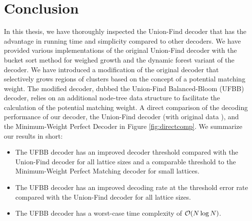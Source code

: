 \section{Conclusion}\label{sec:conclusion}

In this thesis, we have thoroughly inspected the Union-Find decoder that has the advantage in running time and simplicity compared to other decoders. We have provided various implementations of the original Union-Find decoder with the bucket sort method for weighed growth and the dynamic forest variant of the decoder. We have introduced a modification of the original decoder that selectively grows regions of clusters based on the concept of a potential matching weight. The modified decoder, dubbed the Union-Find Balanced-Bloom (UFBB) decoder, relies on an additional node-tree data structure to facilitate the calculation of the potential matching weight. A direct comparison of the decoding performance of our decoder, the Union-Find decoder (with original data \cite{delfosse2017almost}), and the Minimum-Weight Perfect Decoder in Figure \ref{fig:directcomp}. We summarize our results in short:

\begin{itemize}
  \item The UFBB decoder has an improved decoder threshold compared with the Union-Find decoder for all lattice sizes and a comparable threshold to the Minimum-Weight Perfect Matching decoder for small lattices.
  \item The UFBB decoder has an improved decoding rate at the threshold error rate compared with the Union-Find decoder for all lattice sizes. 
  \item The UFBB decoder has a worst-case time complexity of $\mathcal{O}(N\log{N})$. 
\end{itemize}

